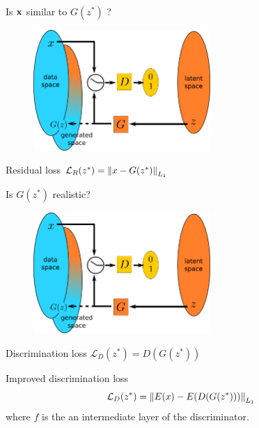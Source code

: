 \documentclass[xcolor=pdftex,dvipsnames,table,mathserif]{beamer}
\begin{document}
\begin{frame}{Is $\mathbf{x}$ similar to $G(z^*)$ ?}

\begin{figure}[ht]
  \centering
  \includegraphics[width=0.6\textwidth]{gan2}
\end{figure}

\begin{block}{Residual loss}
  \centering
  $\mathcal{L}_R(z^*) = \norm{x - G(z^*)}_{L_1}$
  \end{block}

\end{frame}


\begin{frame}{Is $G(z^*)$ realistic?}

\begin{figure}[ht]
  \centering
  \includegraphics[width=0.6\textwidth]{gan2}
\end{figure}

\begin{block}{Discrimination loss}
  \centering
  $\mathcal{L}_D(z^*) = D(G(z^*))$
\end{block}

\begin{block}{Improved discrimination loss}
  \[\mathcal{L}_D(z^*) = \norm{E(x) -  E(D(G(z^*)))}_{L_1}\]
  where $f$ is the an intermediate layer of the discriminator.
\end{block}


\end{frame}
\end{document}
